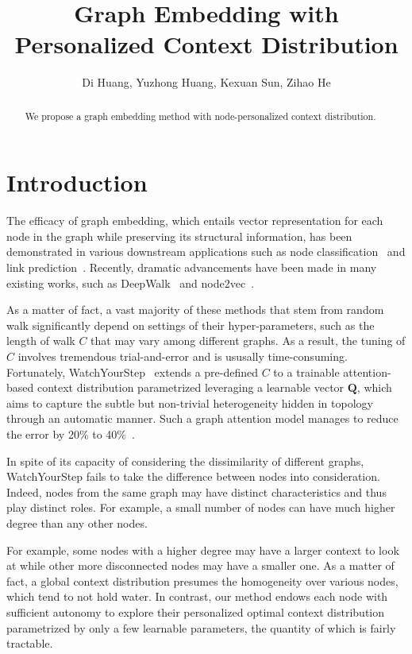 \documentclass{article}
\title{Graph Embedding with Personalized Context Distribution}
\author{
Di Huang, Yuzhong Huang, Kexuan Sun, Zihao He}
\begin{document}
\maketitle

\begin{abstract}
    We propose a graph embedding method with node-personalized context distribution. 
\end{abstract}

\section{Introduction}
The efficacy of graph embedding, which entails vector representation for each node in the graph while preserving its structural information, has been demonstrated in various downstream applications such as node classification~\cite{} and link prediction~\cite{}.
Recently, dramatic advancements have been made in many existing works, such as DeepWalk~\cite{} and node2vec~\cite{}. 

As a matter of fact, a vast majority of these methods that stem from random walk significantly depend on settings of their hyper-parameters, such as the length of walk $C$ that may vary among different graphs. As a result, the tuning of $C$ involves tremendous trial-and-error and is ususally time-consuming.
Fortunately, WatchYourStep~\cite{} extends a pre-defined $C$ to a trainable attention-based context distribution parametrized leveraging a learnable vector $\mathbf{Q}$, which aims to capture the subtle but non-trivial heterogeneity hidden in topology through an automatic manner. Such a graph attention model manages to reduce the error by 20\% to 40\%~\cite{}.

In spite of its capacity of considering the dissimilarity of different graphs, WatchYourStep fails to take the difference between nodes into consideration. Indeed, nodes from the same graph may have distinct characteristics and thus play distinct roles. For example, a small number of nodes can have much higher degree than any other nodes. 

For example, some nodes with a higher degree may have a larger context to look at while other more disconnected nodes may have a smaller one. As a matter of fact, a global context distribution presumes the homogeneity over various nodes, which tend to not hold water. In contrast, our method endows each node with sufficient autonomy to explore their personalized optimal context distribution parametrized by only a few learnable parameters, the quantity of which is fairly tractable.
\end{document}
